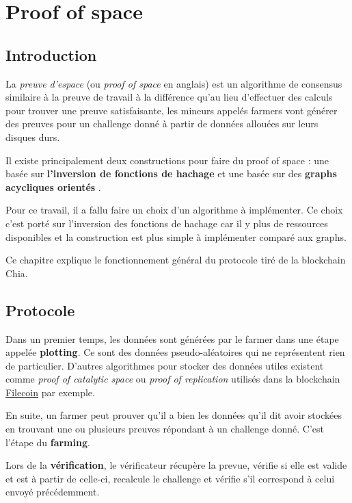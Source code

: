 \chapter{Proof of space}
\label{ch:pospace}

\section{Introduction}

La \emph{preuve d'espace} (ou \emph{proof of space} en anglais) est un algorithme de consensus similaire à la preuve de travail à la différence qu'au lieu d'effectuer des calculs pour trouver une preuve satisfaisante, les mineurs appelés farmers vont générer des preuves pour un challenge donné à partir de données allouées sur leurs disques durs. 

Il existe principalement deux constructions pour faire du proof of space : une basée sur \textbf{l'inversion de fonctions de hachage} \cite{DBLP:conf/asiacrypt/AbusalahACKPR17} et une basée sur des \textbf{graphs acycliques orientés} \cite{DBLP:conf/crypto/DziembowskiFKP15}.

Pour ce travail, il a fallu faire un choix d'un algorithme à implémenter. Ce choix c'est porté sur l'inversion des fonctions de hachage car il y plus de ressources disponibles et la construction est plus simple à implémenter comparé aux graphs.

Ce chapitre explique le fonctionnement général du protocole tiré de la blockchain Chia.

\section{Protocole}

Dans un premier temps, les données sont générées par le farmer dans une étape appelée \textbf{plotting}. Ce sont des données pseudo-aléatoires qui ne représentent rien de particulier. D'autres algorithmes pour stocker des données utiles existent comme \emph{proof of catalytic space} ou \emph{proof of replication} utilisés dans la blockchain \href{https://filecoin.io/}{Filecoin} par exemple.

En suite, un farmer peut prouver qu'il a bien les données qu'il dit avoir stockées en trouvant une ou plusieurs preuves répondant à un challenge donné. C'est l'étape du \textbf{farming}.

Lors de la \textbf{vérification}, le vérificateur récupère la prevue, vérifie si elle est valide et est à partir de celle-ci, recalcule le challenge et vérifie s'il correspond à celui envoyé précédemment.

